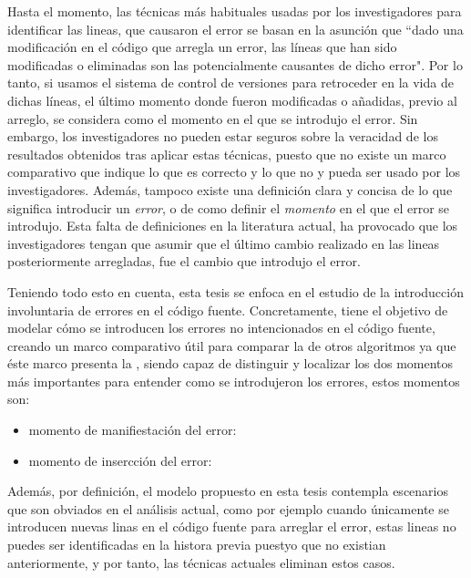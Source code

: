 \documentclass[a4paper, 12pt]{book}
\begin{document}
Hasta el momento, las t\'ecnicas m\'as habituales usadas por los investigadores para identificar las lineas, que causaron el error se basan en la asunci\'on que ``dado una modificaci\'on en el c\'odigo que arregla un error, las l\'ineas que han sido modificadas o eliminadas son las potencialmente causantes de dicho error". Por lo tanto, si usamos el sistema de control de versiones para retroceder en la vida de dichas l\'ineas, el \'ultimo momento donde fueron modificadas o a\~nadidas, previo al arreglo, se considera como el momento en el que se introdujo el error. Sin embargo, los investigadores no pueden estar seguros sobre la veracidad de los resultados obtenidos tras aplicar estas t\'ecnicas, puesto que no existe un marco comparativo que indique lo que es correcto y lo que no y pueda ser usado por los investigadores. Adem\'as, tampoco existe una definici\'on clara y concisa de lo que significa introducir un \emph{error}, o de como definir el \emph{momento} en el que el error se introdujo. Esta falta de definiciones en la literatura actual, ha provocado que los investigadores tengan que asumir que el \'ultimo cambio realizado en las lineas posteriormente arregladas, fue el cambio que introdujo el error.

Teniendo todo esto en cuenta, esta tesis se enfoca en el estudio de la introducci\'on involuntaria de errores en el c\'odigo fuente. Concretamente, tiene el objetivo de modelar c\'omo se introducen los errores no intencionados en el c\'odigo fuente, creando un marco comparativo \'util para  comparar la  de otros algoritmos ya que \'este marco presenta la , siendo capaz de distinguir y localizar los dos momentos m\'as importantes para entender como se introdujeron los errores, estos momentos son:
\begin{itemize}
  \item momento de manifiestaci\'on del error:
  \item momento de insercci\'on del error:
\end{itemize}

Adem\'as, por definici\'on, el modelo propuesto en esta tesis contempla escenarios que son obviados en el an\'alisis actual, como por ejemplo cuando \'unicamente se introducen nuevas linas en el c\'odigo fuente para arreglar el error, estas lineas no puedes ser identificadas en la histora previa puestyo que no existian anteriormente, y por tanto, las t\'ecnicas actuales eliminan estos casos.
\end{document}
